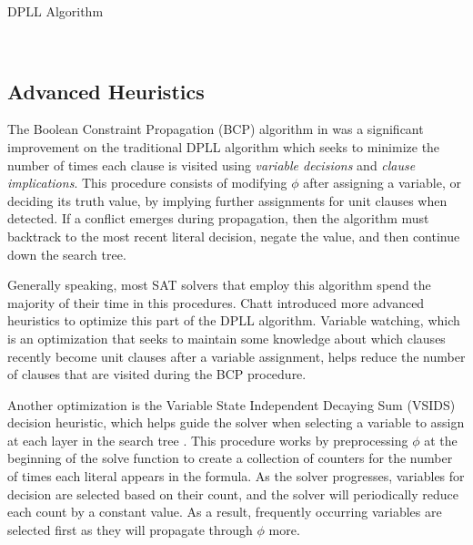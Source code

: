 \documentclass[paper=a4, fontsize=11pt]{scrartcl} %
\begin{document}
\begin{algorithm}[t] %
\caption{DPLL Algorithm \cite{DPLL}} \label{alg:DPLL}
\begin{algorithmic}[1]
\Require{$\phi$}
\EndIf
{}
\EndIf
{}
\EndFor
{}
\EndFor
{}\\
\end{algorithmic}
\end{algorithm}
 
\subsection{Advanced Heuristics}
The Boolean Constraint Propagation (BCP) algorithm in \cite{chaff} was a significant improvement
on the traditional DPLL algorithm which seeks to minimize the number of times
each clause is visited using \emph{variable decisions} and \emph{clause implications}. 
This procedure consists of modifying $\phi$ after assigning a variable,
or deciding its truth value, by implying further assignments for unit clauses when
detected. If a conflict emerges during propagation, then the algorithm must backtrack 
to the most recent literal decision, negate the value, and then continue down the search tree.

Generally speaking, most SAT solvers that employ this algorithm spend the majority of their time in this procedures. 
Chatt \cite{chaff} introduced more advanced heuristics to optimize this part of the 
DPLL algorithm. Variable watching, which is an optimization that seeks to maintain some 
knowledge about which clauses recently become unit clauses after a variable assignment, helps
reduce the number of clauses that are visited during the BCP procedure. 

Another optimization is the Variable State Independent Decaying Sum (VSIDS) decision heuristic, which helps guide
the solver when selecting a variable to assign at each layer in the search tree \cite{chaff}.
This procedure works by preprocessing $\phi$ at the beginning of the solve function
to create a collection of counters for the number of times each literal appears
in the formula. As the solver progresses, variables for decision are selected based on
their count, and the solver will periodically reduce each count by a constant value.
As a result, frequently occurring variables are selected first as they will propagate 
through $\phi$ more. 
\end{document}
